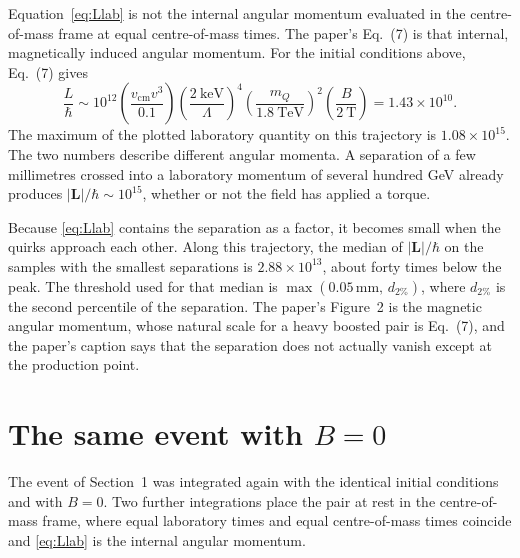 \documentclass[11pt,a4paper]{article}
\begin{document}
Equation~\eqref{eq:Llab} is not the internal angular momentum evaluated in the centre-of-mass frame at equal centre-of-mass times.
The paper's Eq.~(7) is that internal, magnetically induced angular momentum.
For the initial conditions above, Eq.~(7) gives
\begin{equation}
\frac{L}{\hbar}
\sim 10^{12}
\left(\frac{v_{\mathrm{cm}} v^{3}}{0.1}\right)
\left(\frac{\SI{2}{\keV}}{\Lambda}\right)^{4}
\left(\frac{m_Q}{\SI{1.8}{\TeV}}\right)^{2}
\left(\frac{B}{\SI{2}{\tesla}}\right)
= 1.43\times 10^{10}.
\label{eq:eq7}
\end{equation}
The maximum of the plotted laboratory quantity on this trajectory is \(1.08\times 10^{15}\).
The two numbers describe different angular momenta.
A separation of a few millimetres crossed into a laboratory momentum of several hundred GeV already produces \(|\mathbf{L}|/\hbar \sim 10^{15}\), whether or not the field has applied a torque.

Because \eqref{eq:Llab} contains the separation as a factor, it becomes small when the quirks approach each other.
Along this trajectory, the median of \(|\mathbf{L}|/\hbar\) on the samples with the smallest separations is \(2.88\times 10^{13}\), about forty times below the peak.
The threshold used for that median is \(\max(0.05\,\mathrm{mm},\, d_{2\%})\), where \(d_{2\%}\) is the second percentile of the separation.
The paper's Figure~2 is the magnetic angular momentum, whose natural scale for a heavy boosted pair is Eq.~(7), and the paper's caption says that the separation does not actually vanish except at the production point.

\section{The same event with \(B = 0\)}
The event of Section~1 was integrated again with the identical initial conditions and with \(B = 0\).
Two further integrations place the pair at rest in the centre-of-mass frame, where equal laboratory times and equal centre-of-mass times coincide and \eqref{eq:Llab} is the internal angular momentum.
\end{document}
